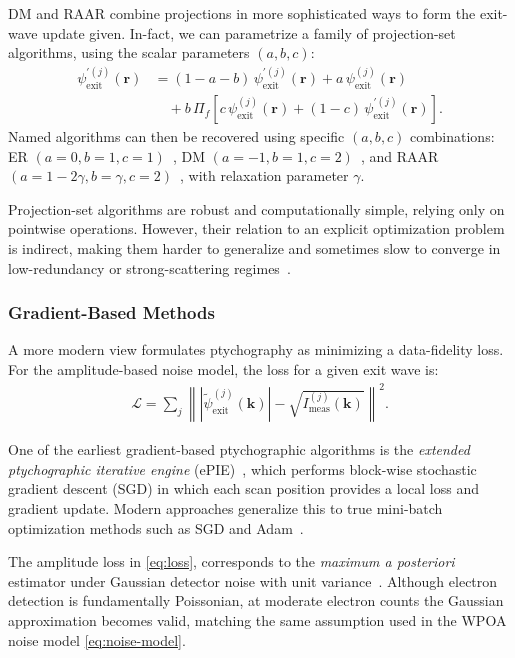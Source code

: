 \documentclass[pdflatex,sn-aps,iicol]{sn-jnl}%
\begin{document}
DM and RAAR combine projections in more sophisticated ways to form the exit-wave update given.
In-fact, we can parametrize a family of projection-set algorithms, using the scalar parameters $(a,b,c)$:
\begin{align}
\psi_{\text{exit}}^{'(j)}(\boldsymbol{r})
&=
(1-a-b)\,\psi_{\text{exit}}^{'(j)}(\boldsymbol{r})
+
a\,\psi_{\text{exit}}^{(j)}(\boldsymbol{r})
\nonumber\\
&\quad+
b\,\Pi_f\!\left[
c\,\psi_{\text{exit}}^{(j)}(\boldsymbol{r})
+
(1-c)\,\psi_{\text{exit}}^{'(j)}(\boldsymbol{r})
\right].
\label{eq:proj-fam}
\end{align}
Named algorithms can then be recovered using specific $(a,b,c)$ combinations:
ER $(a=0,b=1,c=1)$~\cite{Levi_1984}, DM $(a=-1,b=1,c=2)$~\cite{Elser_2003}, and RAAR $(a=1-2\gamma,b=\gamma,c=2)$~\cite{Luke_2004}, with relaxation parameter $\gamma$.

Projection-set algorithms are robust and computationally simple, relying only on pointwise operations.
However, their relation to an explicit optimization problem is indirect, making them harder to generalize and sometimes slow to converge in low-redundancy or strong-scattering regimes~\cite{Varnavides_2023}.

\subsubsection{Gradient-Based Methods}

A more modern view formulates ptychography as minimizing a data-fidelity loss.
For the amplitude-based noise model, the loss for a given exit wave is:
\begin{align}
\mathcal{L}
=
\sum_j
\left\lVert
\left\lvert
\tilde{\psi}_{\text{exit}}^{(j)}(\boldsymbol{k})
\right\rvert
-
\sqrt{I_{\text{meas}}^{(j)}(\boldsymbol{k})}
\right\rVert^2.
\label{eq:loss}
\end{align}

One of the earliest gradient-based ptychographic algorithms is the \emph{extended ptychographic iterative engine} (ePIE)~\cite{Maiden_2009}, which performs block-wise stochastic gradient descent (SGD) in which each scan position provides a local loss and gradient update.
Modern approaches generalize this to true mini-batch optimization methods such as SGD and Adam~\cite{Lee_2025,Gilgenbach_2025,McCray_2025}.

The amplitude loss in \cref{eq:loss}, corresponds to the \emph{maximum a posteriori} estimator under Gaussian detector noise with unit variance~\cite{Gilgenbach_2025}.
Although electron detection is fundamentally Poissonian, at moderate electron counts the Gaussian approximation becomes valid, matching the same assumption used in the WPOA noise model \cref{eq:noise-model}.
\end{document}
